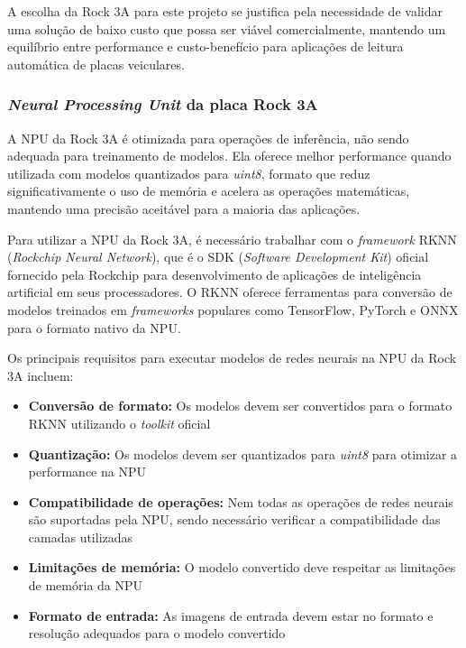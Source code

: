 A escolha da Rock 3A para este projeto se justifica pela necessidade de validar uma solução de baixo custo que possa ser viável comercialmente, mantendo um equilíbrio entre performance e custo-benefício para aplicações de leitura automática de placas veiculares.

\subsubsection{\textit{Neural Processing Unit} da placa Rock 3A}

A NPU da Rock 3A é otimizada para operações de inferência, não sendo adequada para treinamento de modelos. Ela oferece melhor performance quando utilizada com modelos quantizados para \textit{uint8}, formato que reduz significativamente o uso de memória e acelera as operações matemáticas, mantendo uma precisão aceitável para a maioria das aplicações.

Para utilizar a NPU da Rock 3A, é necessário trabalhar com o \textit{framework} RKNN (\textit{Rockchip Neural Network}), que é o SDK (\textit{Software Development Kit}) oficial fornecido pela Rockchip para desenvolvimento de aplicações de inteligência artificial em seus processadores. O RKNN oferece ferramentas para conversão de modelos treinados em \textit{frameworks} populares como TensorFlow, PyTorch e ONNX para o formato nativo da NPU.

Os principais requisitos para executar modelos de redes neurais na NPU da Rock 3A incluem:

\begin{itemize}
    \item \textbf{Conversão de formato:} Os modelos devem ser convertidos para o formato RKNN utilizando o \textit{toolkit} oficial
    \item \textbf{Quantização:} Os modelos devem ser quantizados para \textit{uint8} para otimizar a performance na NPU
    \item \textbf{Compatibilidade de operações:} Nem todas as operações de redes neurais são suportadas pela NPU, sendo necessário verificar a compatibilidade das camadas utilizadas
    \item \textbf{Limitações de memória:} O modelo convertido deve respeitar as limitações de memória da NPU
    \item \textbf{Formato de entrada:} As imagens de entrada devem estar no formato e resolução adequados para o modelo convertido
\end{itemize}

